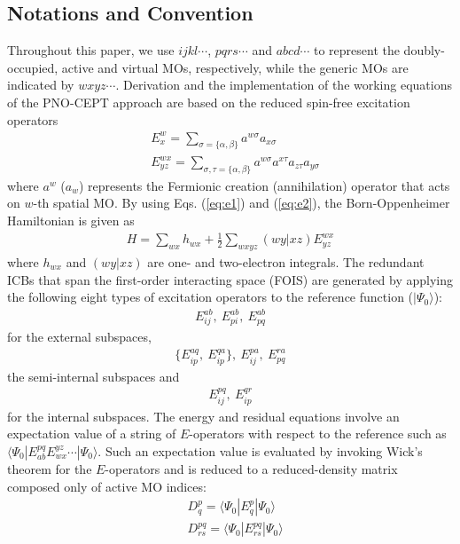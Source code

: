 \documentclass[aip,jcp,amsmath]{revtex4-1}
\begin{document}
\subsection{Notations and Convention}
%
Throughout this paper, we use $ijkl\cdots$, $pqrs\cdots$ and $abcd\cdots$ to represent the doubly-occupied, active and virtual MOs, respectively, while the generic MOs are indicated by $wxyz\cdots$.
%
Derivation and the implementation of the working equations of the PNO-CEPT approach are based on the reduced spin-free excitation operators
%
\begin{align}
  &E^w_x = \sum_{\sigma=\{\alpha,\beta\}} a^{w\sigma}a_{x\sigma} \label{eq:e1} \\
  &E^{wx}_{yz} = \sum_{\sigma,\tau=\{\alpha,\beta\}} a^{w\sigma}a^{x\tau}a_{z\tau}a_{y\sigma} \label{eq:e2}
\end{align}
%
where $a^{w}$ ($a_w$) represents the Fermionic creation (annihilation) operator that acts on $w$-th spatial MO.
%
By using Eqs. (\ref{eq:e1}) and (\ref{eq:e2}), the Born-Oppenheimer Hamiltonian is given as
\begin{align}
  H=\sum_{wx} h_{wx} + \frac{1}{2}\sum_{wxyz} (wy|xz) E^{wx}_{yz}
\end{align}
%
where $h_{wx}$ and $(wy|xz)$ are one- and two-electron integrals.
%
The redundant ICBs that span the first-order interacting space (FOIS) are generated by applying the following eight types of excitation operators to the reference function ($|\Psi_0\rangle$):
%
\begin{align}
  E_{ij}^{ab},\ E_{pi}^{ab},\ E_{pq}^{ab} \label{eq:externalICB}
\end{align}
%
for the external subspaces,
%
\begin{align}
  \{E_{ip}^{aq},\ E_{ip}^{qa}\},\ E_{ij}^{pa},\ E_{pq}^{ra}
\end{align}
%
the semi-internal subspaces and
%
\begin{align}
  E_{ij}^{pq},\ E_{ip}^{qr}
\end{align}
%
for the internal subspaces.
%
The energy and residual equations involve an expectation value of a string of $E$-operators with respect to the reference such as $\langle\Psi_0|E^{pq}_{ab}E_{wx}^{yz}\cdots|\Psi_0\rangle$.
%
Such an expectation value is evaluated by invoking Wick's theorem for the $E$-operators and is reduced to a reduced-density matrix composed only of active MO indices:
%
\begin{align}
  &D^{p}_{q} = \langle\Psi_0|E^{p}_{q}|\Psi_0\rangle  \\
  &D^{pq}_{rs} = \langle\Psi_0|E^{pq}_{rs}|\Psi_0\rangle
\end{align}
\end{document}
